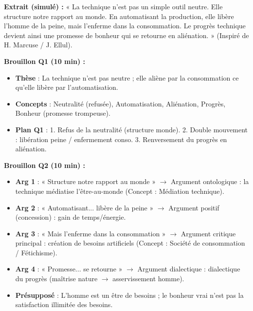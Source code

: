 \documentclass[11pt]{article}
\begin{document}
\begin{exoresolu}
\textbf{Extrait (simulé) :} « La technique n'est pas un simple outil neutre. Elle structure notre rapport au monde. En automatisant la production, elle libère l'homme de la peine, mais l'enferme dans la consommation. Le progrès technique devient ainsi une promesse de bonheur qui se retourne en aliénation. » (Inspiré de H. Marcuse / J. Ellul).

\textbf{Brouillon Q1 (10 min) :}
\begin{itemize}
    \item \textbf{Thèse} : La technique n'est pas neutre ; elle aliène par la consommation ce qu'elle libère par l'automatisation.
    \item \textbf{Concepts} : Neutralité (refusée), Automatisation, Aliénation, Progrès, Bonheur (promesse trompeuse).
    \item \textbf{Plan Q1} : 1. Refus de la neutralité (structure monde). 2. Double mouvement : libération peine / enfermement conso. 3. Renversement du progrès en aliénation.
\end{itemize}

\textbf{Brouillon Q2 (10 min) :}
\begin{itemize}
    \item \textbf{Arg 1} : « Structure notre rapport au monde » $\rightarrow$ Argument ontologique : la technique médiatise l'être-au-monde (Concept : Médiation technique).
    \item \textbf{Arg 2} : « Automatisant... libère de la peine » $\rightarrow$ Argument positif (concession) : gain de temps/énergie.
    \item \textbf{Arg 3} : « Mais l'enferme dans la consommation » $\rightarrow$ Argument critique principal : création de besoins artificiels (Concept : Société de consommation / Fétichisme).
    \item \textbf{Arg 4} : « Promesse... se retourne » $\rightarrow$ Argument dialectique : dialectique du progrès (maîtrise nature $\rightarrow$ asservissement homme).
    \item \textbf{Présupposé} : L'homme est un être de besoins ; le bonheur vrai n'est pas la satisfaction illimitée des besoins.
\end{itemize}


\end{exoresolu}
\end{document}
